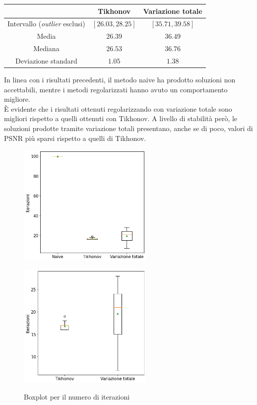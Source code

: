 \documentclass[11pt]{article}
\begin{document}
\begin{center}
    \begin{tabular}{ |c|c|c| }
    \hline
    & Tikhonov & Variazione totale \\ 
    \hline
    Intervallo (\emph{outlier} esclusi) & $[26.03, 28.25]$ & $[35.71, 39.58]$ \\
    Media & $26.39$ & $36.49$ \\
    Mediana & $26.53$ & $36.76$ \\
    Deviazione standard & $1.05$ & $1.38$ \\
    \hline
    \end{tabular}
\end{center}
In linea con i risultati precedenti, il metodo naive ha prodotto soluzioni non accettabili, 
mentre i metodi regolarizzati hanno avuto un comportamento migliore.\\
È evidente che i risultati ottenuti regolarizzando con variazione totale sono migliori rispetto a quelli ottenuti con Tikhonov. A livello di stabilità però, le soluzioni prodotte tramite variazione totali presentano, anche se di poco, valori di PSNR più sparsi rispetto a quelli di Tikhonov.

\begin{figure}[H]
    \centering
    \begin{minipage}{0.45\textwidth}
        \centering
        \includegraphics[width=6.5cm]{esecuzioni_multiple/100/iter1.png}
        \label{fig:100_iter1}
    \end{minipage}\hfill
    \begin{minipage}{0.45\textwidth}
        \centering
        \includegraphics[width=6.5cm]{esecuzioni_multiple/100/iter2.png}
        \label{fig:100_iter2}
    \end{minipage}
    \caption{Boxplot per il numero di iterazioni}
\end{figure}
\end{document}
